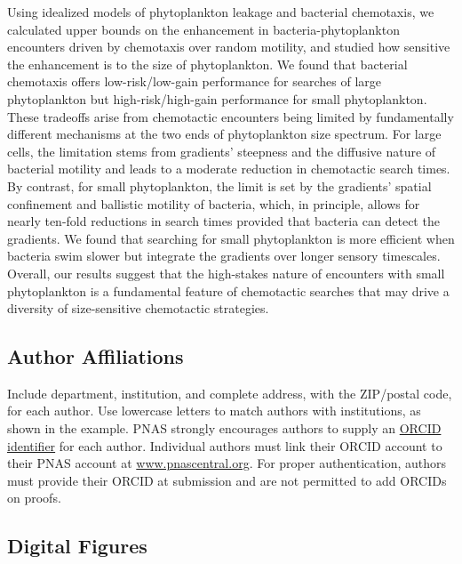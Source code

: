 \documentclass[9pt,twocolumn,twoside]{pnas-new}
\begin{document}
Using idealized models of phytoplankton leakage and bacterial chemotaxis, we calculated upper bounds on the enhancement in bacteria-phytoplankton encounters driven by chemotaxis over random motility, and studied how sensitive the enhancement is to the size of phytoplankton. We found that bacterial chemotaxis offers low-risk/low-gain performance for searches of large phytoplankton but high-risk/high-gain performance for small phytoplankton. These tradeoffs arise from chemotactic encounters being limited by fundamentally different mechanisms at the two ends of phytoplankton size spectrum. For large cells, the limitation stems from gradients' steepness and the diffusive nature of bacterial motility and leads to a moderate reduction in chemotactic search times. By contrast, for small phytoplankton, the limit is set by the gradients' spatial confinement and ballistic motility of bacteria, which, in principle, allows for nearly ten-fold reductions in search times provided that bacteria can detect the gradients. We found that searching for small phytoplankton is more efficient when bacteria swim slower but integrate the gradients over longer sensory timescales. Overall, our results suggest that the high-stakes nature of encounters with small phytoplankton is a fundamental feature of chemotactic searches that may drive a diversity of size-sensitive chemotactic strategies.



\subsection*{Author Affiliations}

Include department, institution, and complete address, with the ZIP/postal code, for each author. Use lowercase letters to match authors with institutions, as shown in the example. PNAS strongly encourages authors to supply an \href{https://orcid.org/}{ORCID identifier} for each author. Individual authors must link their ORCID account to their PNAS account at \href{http://www.pnascentral.org/}{www.pnascentral.org}. For proper authentication, authors must provide their ORCID at submission and are not permitted to add ORCIDs on proofs.

%


\subsection*{Digital Figures}
\end{document}
